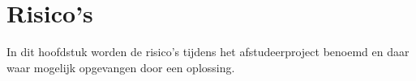 \chapter{Risico's}
In dit hoofdstuk worden de risico's tijdens het afstudeerproject benoemd en daar waar mogelijk opgevangen door een oplossing.\par

